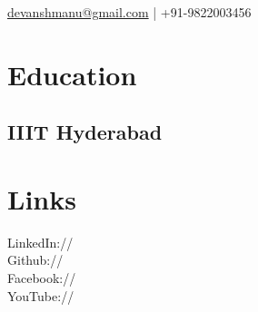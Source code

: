 \documentclass[]{deedy-resume-openfont}
\begin{document}
%
%

%
%


{ 
\href{mailto:devanshmanu@gmail.com}{devanshmanu@gmail.com} | +91-9822003456\\
\vspace{0.5cm}
}

%
%

\begin{minipage}[t]{0.33\textwidth} 

\vspace{1cm}
\section{Education} 

\subsection{IIIT Hyderabad}

\sectionsep




\section{Links} 
LinkedIn://\href{https://www.linkedin.com/in/devanshmanu}{} \\
Github://\href{https://github.com/devanshmanu}{} \\
Facebook://\href{https://facebook.com/devanshmanu}{} \\
YouTube://\href{https://www.youtube.com/user/devanshpiano}{} \\
\sectionsep



\end{minipage}
\end{document}
